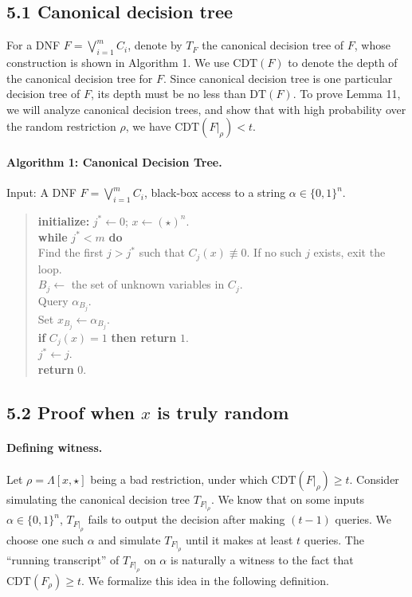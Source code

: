 \documentclass[10pt,a4paper]{article}
\begin{document}
\subsection*{5.1 Canonical decision tree}
For a DNF $F=\bigvee_{i=1}^mC_i$, denote by $T_F$ the canonical decision tree of $F$, whose construction is shown in Algorithm 1. We use $\mathrm{CDT}(F)$ to denote the depth of the canonical decision tree for $F$. Since canonical decision tree is one particular decision tree of $F$, its depth must be no less than $\mathrm{DT}(F)$. To prove Lemma 11, we will analyze canonical decision trees, and show that with high probability over the random restriction $\rho$, we have $\mathrm{CDT}(F|_\rho)<t$.
\paragraph{Algorithm 1: Canonical Decision Tree.}
Input: A DNF $F=\bigvee_{i=1}^mC_i$, black-box access to a string $\alpha\in\{0,1\}^n$.
\begin{quote}\textbf{initialize:} $j^*\leftarrow0$; $x\leftarrow(\star)^n$.\\
\textbf{while} $j^*<m$ \textbf{do}\\
\hspace*{1em}Find the first $j>j^*$ such that $C_j(x)\not\equiv0$. If no such $j$ exists, exit the loop.\\
\hspace*{1em}$B_j\leftarrow$ the set of unknown variables in $C_j$.\\
\hspace*{1em}Query $\alpha_{B_j}$.\\
\hspace*{1em}Set $x_{B_j}\leftarrow\alpha_{B_j}$.\\
\hspace*{1em}\textbf{if} $C_j(x)=1$ \textbf{then return} $1$.\\
\hspace*{1em}$j^*\leftarrow j$.\\
\textbf{return} $0$.\end{quote}
\subsection*{5.2 Proof when $x$ is truly random}
\paragraph{Defining witness.} Let $\rho=\Lambda[x,\star]$ being a bad restriction, under which $\mathrm{CDT}(F|_\rho)\ge t$. Consider simulating the canonical decision tree $T_{F|_\rho}$. We know that on some inputs $\alpha\in\{0,1\}^n$, $T_{F|_\rho}$ fails to output the decision after making $(t-1)$ queries. We choose one such $\alpha$ and simulate $T_{F|_\rho}$ until it makes at least $t$ queries. The ``running transcript'' of $T_{F|_\rho}$ on $\alpha$ is naturally a witness to the fact that $\mathrm{CDT}(F_\rho)\ge t$. We formalize this idea in the following definition.
\end{document}
